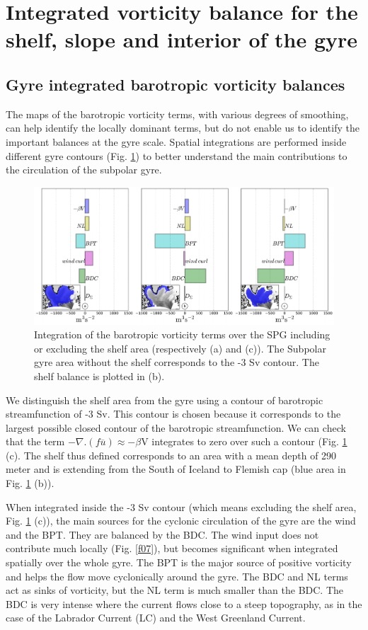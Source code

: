 \documentclass[os, manuscript]{copernicus}
\begin{document}
\section{Integrated vorticity balance for the shelf, slope and interior of the gyre}
\subsection{Gyre integrated barotropic vorticity balances}

The maps of the barotropic vorticity terms, with various degrees of smoothing, can help identify the locally dominant terms, but do not enable us to identify the important balances at the gyre scale. Spatial integrations are performed inside different gyre contours (Fig. \ref{f09}) to better understand the main contributions to the circulation of the subpolar gyre. 

\begin{figure}[t]
\includegraphics[width=14cm]{../fig_os/f09.pdf}
\caption{Integration of the barotropic vorticity terms over the SPG including or excluding the shelf area (respectively (a) and (c)). The Subpolar gyre area without the shelf corresponds to the -3 Sv contour. The shelf balance is plotted in (b).}
\label{f09}
\end{figure} 

We distinguish the shelf area from the gyre using a contour of barotropic streamfunction of -3 Sv. This contour is chosen because it corresponds to the largest possible closed contour of the barotropic streamfunction. We can check that the term $-\nabla.(f\overline{u}) \approx -\beta$V integrates to zero over such a contour (Fig. \ref{f09} (c). The shelf thus defined corresponds to an area with a mean depth of 290 meter and is extending from the South of Iceland to Flemish cap (blue area in Fig. \ref{f09} (b)).

When integrated inside the -3 Sv contour (which means excluding the shelf area, Fig. \ref{f09} (c)), the main sources for the cyclonic circulation of the gyre are the wind and the BPT. They are balanced by the BDC. The wind input does not contribute much locally (Fig. \ref{f07}), but becomes significant when integrated spatially over the whole gyre. The BPT is the major source of positive vorticity and helps the flow move cyclonically around the gyre. The BDC and NL terms act as sinks of vorticity, but the NL term is much smaller than the BDC. The BDC is very intense where the current flows close to a steep topography, as in the case of the Labrador Current (LC) and the West Greenland Current. 
\end{document}
